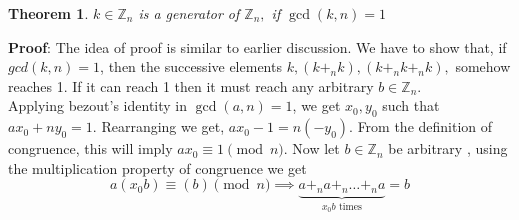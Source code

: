 \documentclass{article}
\newtheorem{theorem}{Theorem}[section]
\begin{document}
\begin{theorem}
	$k \in \mathbb{Z}_n$ is a generator of $\mathbb{Z}_n,$ if $\gcd(k,n)=1$
\end{theorem}
\textbf{Proof}: The idea of proof is similar to earlier discussion. We have to show that, if $gcd(k,n)=1$, then the successive elements $k, (k +_n k) , (k +_n k +_n k),$ somehow reaches 1. If it can reach 1 then it must reach any arbitrary $b \in \mathbb{Z}_n$.\\[2mm]
Applying bezout's identity in $\gcd(a,n)=1$, we get $x_0, y_0$ such that $ax_0 +ny_0=1$. Rearranging we get, $ax_0-1=n(-y_0)$. From the definition of congruence, this will imply $ax_0 \equiv 1 \pmod{n}$. Now let $b \in \mathbb{Z}_n$ be arbitrary , using the multiplication property of congruence we get
$$a(x_0b) \equiv (b) \pmod{n}\implies \underbrace{a +_n a +_n \ldots +_n a}_{x_0b \text{ times}} = b$$
\\
\end{document}

